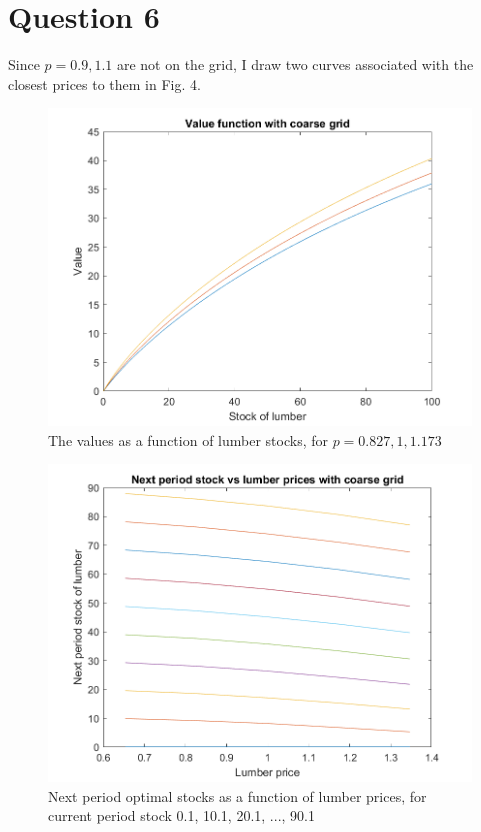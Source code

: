 \documentclass[12pt]{article}
\begin{document}
\section*{Question 6}
Since $p=0.9, 1.1$ are not on the grid, I draw two curves associated with the closest prices to them in Fig. 4.
\begin{figure}[h]
\includegraphics[width=\textwidth]{vf2.png}
\caption{The values as a function of lumber stocks, for $p=0.827, 1, 1.173$}
\end{figure}
\clearpage
\begin{figure}
\includegraphics[width=\textwidth]{nextstock2.png}
\caption{Next period optimal stocks as a function of lumber prices, for current period stock 0.1, 10.1, 20.1, ..., 90.1}
\end{figure}
\end{document}
